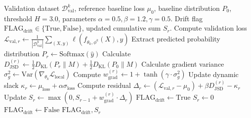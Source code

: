 \documentclass[journal,twocolumn,10pt]{IEEEtran}
\begin{document}
\begin{algorithm}[!t]
\caption{Adaptive Divergence-Weighted CUSUM (AD-CUSUM)}\label{alg:ad_cusum}
\begin{algorithmic}[1]
\REQUIRE Validation dataset $\mathcal{D}_{\text{val}}^k$, reference baseline loss $\mu_0$, baseline distribution $P_0$, threshold $H = 3.0$, parameters $\alpha = 0.5, \beta = 1.2, \gamma = 0.5$.
\ENSURE Drift flag $\text{FLAG}_{\text{drift}} \in \{\text{True}, \text{False}\}$, updated cumulative sum $S_r$.
\STATE Compute validation loss $\mathcal{L}_{\text{val}, r} \leftarrow \frac{1}{|\mathcal{D}_{\text{val}}^k|} \sum_{(X, y)} \ell(f_{\theta_k, \phi^k}(X), y)$
\STATE Extract predicted probability distribution $P_r \leftarrow \text{Softmax}(\hat{y})$
\STATE Calculate $D_{\text{JSD}}^{(r)} \leftarrow \frac{1}{2} D_{\text{KL}}(P_r \parallel M) + \frac{1}{2} D_{\text{KL}}(P_0 \parallel M)$
\STATE Calculate gradient variance $\sigma_g^2 \leftarrow \text{Var}(\nabla_{\theta_k} \mathcal{L}_{\text{local}})$
\STATE Compute $w_{\text{grad}}^{(r)} \leftarrow 1 + \tanh(\gamma \cdot \sigma_g^2)$
\STATE Update dynamic slack $\kappa_r \leftarrow \mu_{\text{loss}} + \alpha \sigma_{\text{loss}}$
\STATE Compute residual $\Delta_r \leftarrow (\mathcal{L}_{\text{val}, r} - \mu_0) + \beta D_{\text{JSD}}^{(r)} - \kappa_r$
\STATE Update $S_r \leftarrow \max\left(0, S_{r-1} + w_{\text{grad}}^{(r)} \cdot \Delta_r\right)$
    \STATE $\text{FLAG}_{\text{drift}} \leftarrow \text{True}$
    \STATE $S_r \leftarrow 0$ 
\ELSE
    \STATE $\text{FLAG}_{\text{drift}} \leftarrow \text{False}$
\ENDIF
\RETURN $\text{FLAG}_{\text{drift}}, S_r$
\end{algorithmic}
\end{algorithm}
\end{document}
